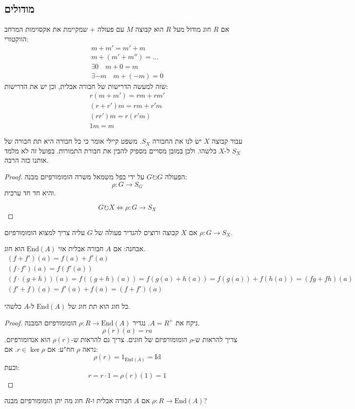 \documentclass{tstextbook}
\begin{document}
\subsection{מודולים}

\begin{definition}[מודול]
אם \(R\) חוג מודול מעל \(R\) הוא קבוצה \(M\) עם פעולה \(+\) שמקיימת את אקסוימות המרחב הווקטורי:
$$\begin{gather}m+m'=m'+m \\m+(m'+m'')=\dots \\\exists 0 \quad m+0=m \\\exists-m \quad m+(-m)=0
\end{gather}$$
שזה למעשה הדרישות של חבורה אבלית, וכן יש את הדרישות:
$$\begin{gather}r(m+m')=r m + rm'  \\(r+r')m=r m + r' m \\(rr')m=r(r'm) \\1m = m
\end{gather}$$

\end{definition}
עבור קבוצה \(X\) יש לנו את החבורה \(S_{X}\). משפט קיילי אומר כי כל חבורה היא תת חבורה של \(S_{X}\) ל-\(X\) כלשהו. ולכן במובן מסויים מספיק להבין את חבורת התמורות. בפועל זה לא מלמד אותנו כזה הרבה.

\begin{proof}
הפעולה \(G \circlearrowright G\) על ידי כפל משמאל משרה הומומורפיזם מבנה:
$$\rho:G\to S_{G}$$
והיא חד חד ערכית.

$$G\circlearrowright X \iff \rho:G\to S_{X}$$

\end{proof}
אם \(X\) קבוצה ורוצים להגדיר פעולה של \(G\) עליה צריך למצוא הומומורפיזם \(\rho:G\to S_{X}\). 

אבחנה: אם \(A\) חבורה אבלית אזי \(\text{End}(A)\) הוא חוג.
$$\begin{gather}(f+f')(a)=f(a)+f'(a)\\ (f\cdot f')(a)=f(f'(a)) \\(f\cdot(g+h))(a)=f((g+h)(a))=f(g(a)+h(a))=f(g(a))+f(h(a))=(fg+fh)(a) \\(f'+f)(a)=f'(a)+f(a)=(f+f')(a)
\end{gather}$$

\begin{theorem}
כל חוג הוא תת חוג של \(\text{End}(A)\) ל-\(A\) כלשהי.

\end{theorem}
\begin{proof}
ניקח את \(A=R^{+}\). נגדיר \(\rho:R\to \mathrm{End}(A)\) הומומורפיזם המבנה.
$$\rho(r)(a)=ra$$
צריך להראות ש-\(\rho\) הומומורפיזם של חוגים.
צריך גם להראות ש-\(\rho(r)\) הוא אנדומורפיזם.
נראה \(\rho\) חח"ע: אם \(r \in \ker \rho\). אם:
$$\rho(r)=1_{\text{End}(A)}=\mathrm{Id}$$
וכעת:
$$r=r\cdot 1=\rho(r)(1)=1$$

\end{proof}
אם \(A\) חבורה אבלית ו-\(R\) חוג מה יתן הומומורפיזם מבנה \(\rho:R\to \mathrm{End}(A)\)?
\end{document}

